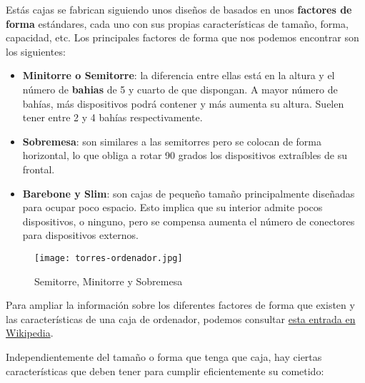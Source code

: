 Estás cajas se fabrican siguiendo unos diseños de basados en unos \textbf{factores de forma} estándares, cada uno con sus propias características de tamaño, forma, capacidad, etc. Los principales factores de forma que nos podemos encontrar son los siguientes:

\begin{itemize}
    \item \textbf{Minitorre o Semitorre}: la diferencia entre ellas está en la altura y el número de \textbf{\gls{bahias}} de 5 y cuarto de que dispongan. A mayor número de bahías, más dispositivos podrá contener y más aumenta su altura. Suelen tener entre 2 y 4 bahías respectivamente.
    \item \textbf{Sobremesa}: son similares a las semitorres pero se colocan de forma horizontal, lo que obliga a rotar 90 grados los dispositivos extraíbles de su frontal.
    \item \textbf{Barebone y Slim}: son cajas de pequeño tamaño principalmente diseñadas para ocupar poco espacio. Esto implica que su interior admite pocos dispositivos, o ninguno, pero se compensa aumenta el número de conectores para dispositivos externos.
\end{itemize}

\begin{figure}[ht]
    \centering
    \texttt{[image: torres-ordenador.jpg]}
    \caption{Semitorre, Minitorre y Sobremesa}
\end{figure}

Para ampliar la información sobre los diferentes factores de forma que existen y las características de una caja de ordenador, podemos consultar \href{https://es.wikipedia.org/wiki/Caja_de_computadora}{esta entrada en Wikipedia}.

Independientemente del tamaño o forma que tenga que caja, hay ciertas características que deben tener para cumplir eficientemente su cometido:

